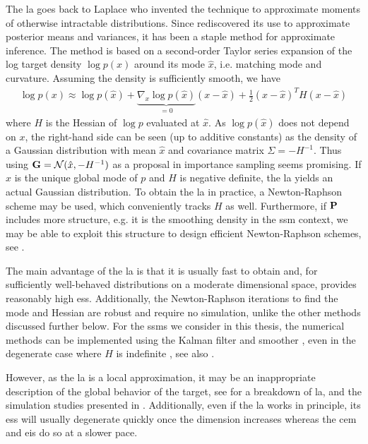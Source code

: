 The \acrfull{la} goes back to Laplace \citep{Laplace1986Memoir} who invented the technique to approximate moments of otherwise intractable distributions. Since \citep{Tierney1986Accurate,Tierney1989Fully} rediscovered its use to approximate posterior means and variances, it has been a staple method for approximate inference.
The method is based on a second-order Taylor series expansion of the log target density $\log p(x)$ around its mode $\hat x$, i.e. matching mode and curvature. Assuming the density is sufficiently smooth, we have
\begin{align}
    \label{eq:LA_approximation}
\log p(x) \approx \log p(\hat x) + \underbrace{\nabla_{x} \log p (\hat x)}_{= 0} \left( x - \hat x \right) + \frac{1}{2} (x - \hat x)^{T} H (x - \hat x)
\end{align}
where $H$ is the Hessian of $\log p$ evaluated at $\hat x$. As $\log p (\hat x)$ does not depend on $x$, the right-hand side can be seen (up to additive constants) as the density of a Gaussian distribution with mean $\hat x$ and covariance matrix $\Sigma = - H^{-1}$. Thus using $\G = \mathcal N (\hat x, -H^{-1})$ as a proposal in importance sampling seems promising. 
If $\hat x$ is the unique global mode of $p$ and $H$ is negative definite, the \gls{la} yields an actual Gaussian distribution. 
To obtain the \acrshort{la} in practice, a Newton-Raphson scheme may be used, which conveniently tracks $H$ as well. Furthermore, if $\P$ includes more structure, e.g. it is the smoothing density in the \acrshort{ssm} context, we may be able to exploit this structure to design efficient Newton-Raphson schemes, see .

The main advantage of the \gls{la} is that it is usually fast to obtain and, for sufficiently well-behaved distributions on a moderate dimensional space, provides reasonably high \gls{ess}. Additionally, the Newton-Raphson iterations to find the mode and Hessian are robust and require no simulation, unlike the other methods discussed further below.
For the \glspl{ssm} we consider in this thesis, the numerical methods can be implemented using the Kalman filter and smoother \citep{Shephard1997Likelihood,Durbin1997Monte}, even in the degenerate case where $H$ is indefinite \citep{Jungbacker2007Monte}, see also .

However, as the \gls{la} is a local approximation, it may be an inappropriate description of the global behavior of the target, see  for a breakdown of \gls{la}, and the simulation studies presented in . 
Additionally, even if the \gls{la} works in principle, its \gls{ess} will usually degenerate quickly once the dimension increases whereas the \gls{cem} and \gls{eis} do so at a slower pace.

%



